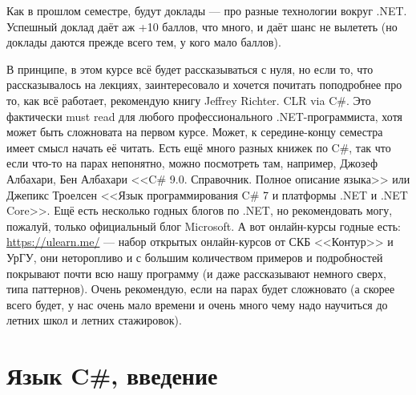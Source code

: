 \documentclass[a5paper]{article}
\begin{document}
Как в прошлом семестре, будут доклады --- про разные технологии вокруг .NET. Успешный доклад даёт аж +10 баллов, что много, и даёт шанс не вылететь (но доклады даются прежде всего тем, у кого мало баллов).

В принципе, в этом курсе всё будет рассказываться с нуля, но если то, что рассказывалось на лекциях, заинтересовало и хочется почитать поподробнее про то, как всё работает, рекомендую книгу Jeffrey Richter. CLR via C\#. Это фактически must read для любого профессионального .NET-программиста, хотя может быть сложновата на первом курсе. Может, к середине-концу семестра имеет смысл начать её читать. Есть ещё много разных книжек по C\#, так что если что-то на парах непонятно, можно посмотреть там, например, Джозеф Албахари, Бен Албахари <<C\# 9.0. Справочник. Полное описание языка>> или Джепикс Троелсен <<Язык программирования C\# 7 и платформы .NET и .NET Core>>. Ещё есть несколько годных блогов по .NET, но рекомендовать могу, пожалуй, только официальный блог Microsoft. А вот онлайн-курсы годные есть: \url{https://ulearn.me/} --- набор открытых онлайн-курсов от СКБ <<Контур>> и УрГУ, они неторопливо и с большим количеством примеров и подробностей покрывают почти всю нашу программу (и даже рассказывают немного сверх, типа паттернов). Очень рекомендую, если на парах будет сложновато (а скорее всего будет, у нас очень мало времени и очень много чему надо научиться до летних школ и летних стажировок).

\section{Язык C\#, введение}
\end{document}
